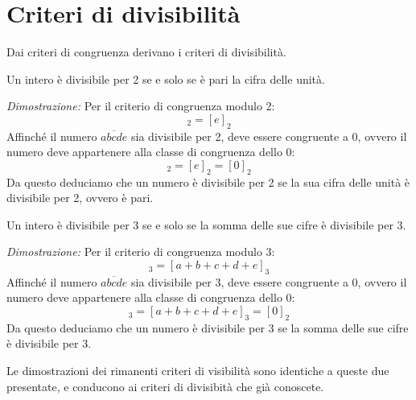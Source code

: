 \section{Criteri di divisibilità}

Dai criteri di congruenza derivano i criteri di divisibilità.

    \begin{teorema}
        Un intero è divisibile per 2 se e solo se è pari la cifra delle unità.
    \end{teorema}
    \begin{dimostrazione}
        \emph{Dimostrazione:}
        Per il criterio di congruenza modulo 2:
        \begin{equation*}
            [\overline{abcde}]_2 = [e]_2
        \end{equation*}
        Affinché il numero $\overline{abcde}$ sia divisibile per 2, deve essere congruente a 0, ovvero il numero deve appartenere alla classe di congruenza dello 0:
        \begin{equation*}
            [\overline{abcde}]_2 = [e]_2 = [0]_2
        \end{equation*}
        Da questo deduciamo che un numero è divisibile per 2 se la sua cifra delle unità è divisibile per 2, ovvero è pari.
    \end{dimostrazione}

    \begin{teorema}
        Un intero è divisibile per 3 se e solo se la somma delle sue cifre è divisibile per 3.
    \end{teorema}
    \begin{dimostrazione}
        \emph{Dimostrazione:}
        Per il criterio di congruenza modulo 3:
        \begin{equation*}
            [\overline{abcde}]_3 = [a + b + c + d + e]_3
        \end{equation*}
        Affinché il numero $\overline{abcde}$ sia divisibile per 3, deve essere congruente a 0, ovvero il numero deve appartenere alla classe di congruenza dello 0:
        \begin{equation*}
            [\overline{abcde}]_3 = [a + b + c + d + e]_3 = [0]_2
        \end{equation*}
        Da questo deduciamo che un numero è divisibile per 3 se la somma delle sue cifre è divisibile per 3.
    \end{dimostrazione}

Le dimostrazioni dei rimanenti criteri di visibilità sono identiche a queste due presentate, e conducono ai criteri di divisibità che già conoscete.

